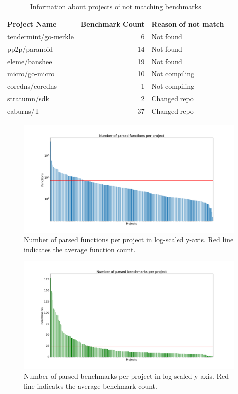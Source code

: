 \documentclass{seal_thesis}
\begin{document}
\begin{table}[H]
	\begin{longtable}[c]{@{}lrl@{}}
		\caption{Information about projects of not matching benchmarks}
		\label{table:infinalnotcsv1}\\
		\toprule
		Project Name & Benchmark Count & Reason of not match \\* \midrule
		\endfirsthead
		\endhead
		\bottomrule
		\endfoot
		\endlastfoot
		tendermint/go-merkle & 6 & Not found \\
		pp2p/paranoid & 14 & Not found \\
		eleme/banshee & 19 & Not found \\
		micro/go-micro & 10 & Not compiling \\
		coredns/coredns & 1 & Not compiling \\
		stratumn/sdk & 2 & Changed repo \\
		eaburns/T & 37 & Changed repo \\* \bottomrule
	\end{longtable}
\end{table}


\begin{figure}[H]
	\centering
	\includegraphics[width=\textwidth]{parsedfunctions}
	\caption{Number of parsed functions per project in log-scaled y-axis. Red line indicates the average function count.}
	\label{fig:parsed}
\end{figure}

\begin{figure}[H]
	\centering
	\includegraphics[width=\textwidth]{parsedbenchmarks}
	\caption{Number of parsed benchmarks per project in log-scaled y-axis. Red line indicates the average benchmark count.}
	\label{fig:parsedb}
\end{figure}
\end{document}
